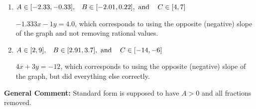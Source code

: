\documentclass{extbook}[14pt]
\begin{document}
\begin{enumerate}
{\begin{enumerate}[label=\Alph*.]
 $-4x + 3y = -12$, which corresponds to not making $A$ positive (by multiplying the equation by $-1$).
\item \( A \in [-2.33, -0.33], \hspace{3mm} B \in [-2.01, 0.22], \text{ and } \hspace{3mm} C \in [4, 7] \)

 $-1.333x - 1y = 4.0$, which corresponds to using the opposite (negative) slope of the graph and not removing rational values.
\item \( A \in [2, 9], \hspace{3mm} B \in [2.91, 3.7], \text{ and } \hspace{3mm} C \in [-14, -6] \)

 $4x + 3y = -12$, which corresponds to using the opposite (negative) slope of the graph, but did everything else correctly.
\end{enumerate}

\textbf{General Comment:} Standard form is supposed to have $A > 0$ and all fractions removed.
}
\end{enumerate}
\end{document}
